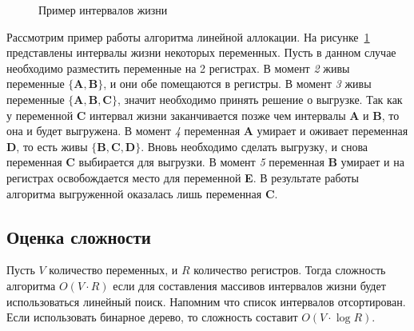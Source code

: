 \begin{example}
\begin{figure}
\begin{tikzpicture}
        \end{tikzpicture}
        \caption{Пример интервалов жизни}
        \label{fig:live_interval_example}
    \end{figure}

    Рассмотрим пример работы алгоритма линейной аллокации.
    На рисунке~\ref{fig:live_interval_example} представлены интервалы жизни
    некоторых переменных.
    Пусть в данном случае необходимо разместить переменные на 2 регистрах.
    В момент \textit{2} живы переменные $\{\textbf{A}, \textbf{B}\}$, и они обе помещаются в регистры.
    В момент \textit{3} живы переменные $\{\textbf{A}, \textbf{B}, \textbf{C}\}$, значит необходимо принять решение о выгрузке.
    Так как у переменной $\textbf{C}$ интервал жизни заканчивается позже чем интервалы \textbf{A} и \textbf{B}, то она и будет
    выгружена.
    В момент \textit{4} переменная \textbf{A} умирает и оживает переменная \textbf{D}, то есть живы $\{\textbf{B}, \textbf{C}, \textbf{D}\}$.
    Вновь необходимо сделать выгрузку, и снова переменная \textbf{C} выбирается для выгрузки.
    В момент \textit{5} переменная \textbf{B} умирает и на регистрах освобождается место для переменной \textbf{E}.
    В результате работы алгоритма выгруженной оказалась лишь переменная \textbf{C}.
    
\end{example}

\subsection{Оценка сложности}

Пусть $V$ количество переменных, и $R$ количество регистров.
Тогда сложность алгоритма $\textit{O}(V \cdot R)$ если для составления массивов интервалов жизни будет использоваться
линейный поиск.
Напомним что список интервалов отсортирован.
Если использовать бинарное дерево, то сложность составит $\textit{O}(V \cdot \log R)$.
